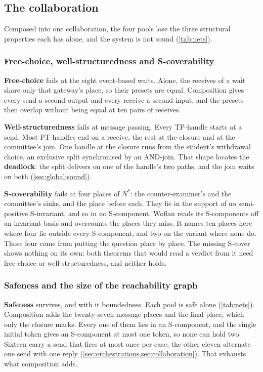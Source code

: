 \subsection{The collaboration}
\label{sec:global}

Composed into one collaboration, the four pools lose the three structural properties each has alone, and the system is not sound (\cref{tab:nets}).

\subsubsection{Free-choice, well-structuredness and S-coverability}

\textbf{Free-choice} fails at the eight event-based waits. Alone, the receives of a wait share only that gateway's place, so their presets are equal. Composition gives every send a second output and every receive a second input, and the presets then overlap without being equal at ten pairs of receives.

\textbf{Well-structuredness} fails at message passing. Every TP-handle starts at a send. Most PT-handles end on a receive, the rest at the closure and at the committee's join. One handle at the closure runs from the student's withdrawal choice, an exclusive split synchronised by an AND-join. That shape locates the \textbf{deadlock}: the split delivers on one of the handle's two paths, and the join waits on both (\cref{sec:global:sound}).

\textbf{S-coverability} fails at four places of $N^*$: the counter-examiner's and the committee's sinks, and the place before each. They lie in the support of no semi-positive S-invariant, and so in no S-component. Woflan reads its S-components off an invariant basis and overcounts the places they miss. It names ten places here where four lie outside every S-component, and two on the variant where none do. Those four come from putting the question place by place. The missing S-cover shows nothing on its own: both theorems that would read a verdict from it need free-choice or well-structuredness, and neither holds.

\subsubsection{Safeness and the size of the reachability graph}

\textbf{Safeness} survives, and with it boundedness. Each pool is safe alone (\cref{tab:nets}). Composition adds the twenty-seven message places and the final place, which only the closure marks. Every one of them lies in an S-component, and the single initial token gives an S-component at most one token, so none can hold two. Sixteen carry a send that fires at most once per case; the other eleven alternate one send with one reply (\cref{sec:orchestrations,sec:collaboration}). That exhausts what composition adds.

